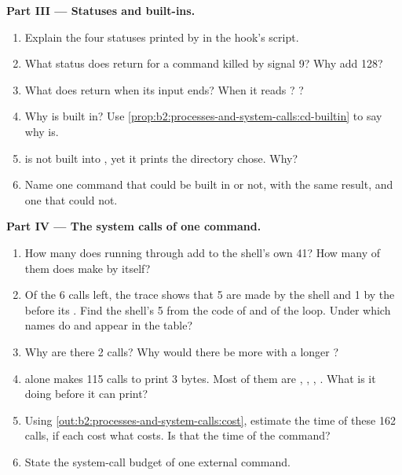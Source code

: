 \begin{problem}
\medskip\noindent\textbf{Part III --- Statuses and built-ins.}\par\nopagebreak
\begin{enumerate}[resume, beginpenalty=10000]
\item Explain the four statuses printed by  in the hook's script.
\item What status does  return for a command killed by signal 9? Why add 128?
\item What does  return when its input ends? When it reads ? ?
\item Why is  built in? Use \cref{prop:b2:processes-and-system-calls:cd-builtin} to say why  is.
\item {} is not built into , yet it prints the directory  chose. Why?
\item Name one command that could be built in or not, with the same result, and one that could not.
\end{enumerate}

\medskip\noindent\textbf{Part IV --- The system calls of one command.}\par\nopagebreak
{}\label{out:b2:processes-and-system-calls:budget}
\begin{enumerate}[resume, beginpenalty=10000]
\item How many  does running  through  add to the shell's own 41? How many of
them does  make by itself?
\item Of the 6 calls left, the trace shows that 5 are made by the shell and 1 by the  before its . Find
the shell's 5 from the code of  and of the loop. Under which names do  and 
appear in the table?
\item Why are there 2  calls? Why would there be more with a longer ?
\item {} alone makes 115 calls to print 3 bytes. Most of them are , ,
, . What is it doing before it can print?
\item Using \cref{out:b2:processes-and-system-calls:cost}, estimate the time of these 162 calls, if each cost what
 costs. Is that the time of the command?
\item State the system-call budget of one external command.
\end{enumerate}
\end{problem}
